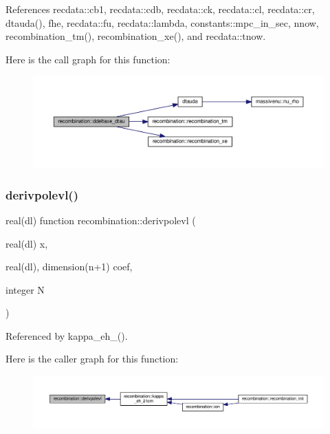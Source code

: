 References recdata\+::cb1, recdata\+::cdb, recdata\+::ck, recdata\+::cl, recdata\+::cr, dtauda(), fhe, recdata\+::fu, recdata\+::lambda, constants\+::mpc\+\_\+in\+\_\+sec, nnow, recombination\+\_\+tm(), recombination\+\_\+xe(), and recdata\+::tnow.

Here is the call graph for this function\+:
\nopagebreak
\begin{figure}[H]
\begin{center}
\leavevmode
\includegraphics[width=350pt]{namespacerecombination_a7445052618f5f8ed0d793a58eb66c768_cgraph}
\end{center}
\end{figure}
\mbox{\label{namespacerecombination_aae74849488f7c602dd70b57a9e9782f2}} 
\subsubsection{\texorpdfstring{derivpolevl()}{derivpolevl()}}
{\footnotesize\ttfamily real(dl) function recombination\+::derivpolevl (\begin{DoxyParamCaption}\item[{real(dl)}]{x,  }\item[{real(dl), dimension(n+1)}]{coef,  }\item[{integer}]{N }\end{DoxyParamCaption})\hspace{0.3cm}{\ttfamily [private]}}



Referenced by kappa\+\_\+eh\+\_\+21cm().

Here is the caller graph for this function\+:
\nopagebreak
\begin{figure}[H]
\begin{center}
\leavevmode
\includegraphics[width=350pt]{namespacerecombination_aae74849488f7c602dd70b57a9e9782f2_icgraph}
\end{center}
\end{figure}
\mbox{\label{namespacerecombination_a7c190d70dfd56d14181b4ae8535dcd4d}} 
